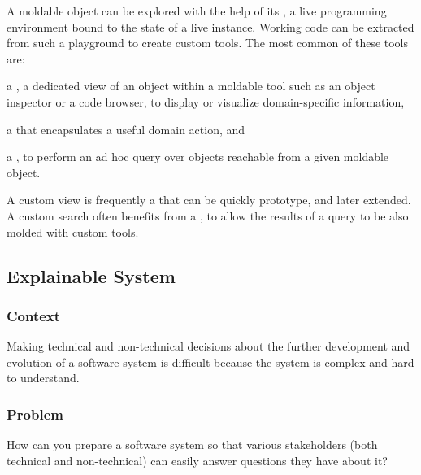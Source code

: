 \documentclass[sigconf]{acmart}
\begin{document}
A moldable object can be explored with the help of its , a live programming environment bound to the state of a live instance.
Working code can be extracted from such a playground to create custom tools.
The most common of these tools are:
\begin{inparaenum}[(i)]
\item a , a dedicated view of an object within a moldable tool such as an object inspector or a code browser, to display or visualize domain-specific information,
\item a  that encapsulates a useful domain action, and
\item a , to perform an ad hoc query over objects reachable from a given moldable object.
\end{inparaenum}
A custom view is frequently a  that can be quickly prototype, and later extended.
A custom search often benefits from a , to allow the results of a query to be also molded with custom tools.



\subsection*{Explainable System}\label{pat:explainableSystem}

\subsubsection*{Context}

Making technical and non-technical decisions about the further development and evolution of a software system is difficult because the system is complex and hard to understand.

\subsubsection*{Problem}

How can you prepare a software system so that various stakeholders (both technical and non-technical) can easily answer questions they have about it?
\end{document}
